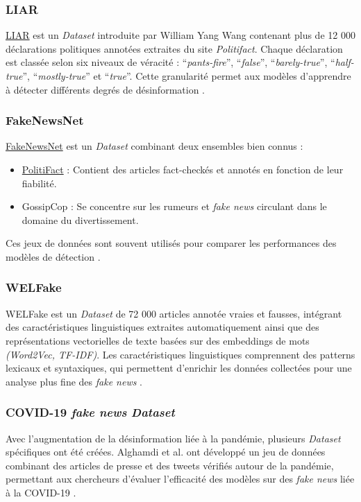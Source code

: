 \documentclass[a4paper,12pt, twocolumn]{article}
\begin{document}
\begin{twocolumn}
\subsubsection{LIAR} 
\href{https://paperswithcode.com/Dataset/liar}{LIAR} est un \textit{Dataset} introduite par William Yang Wang contenant plus de 12 000 déclarations politiques annotées extraites du site \textit{Politifact}. Chaque déclaration est classée selon six niveaux de véracité : “\textit{pants-fire}”, “\textit{false}”, “\textit{barely-true}”, “\textit{half-true}”, “\textit{mostly-true}” et “\textit{true}”. Cette granularité permet aux modèles d’apprendre à détecter différents degrés de désinformation  \cite{william_yang_wang_liar_2017}.

\subsubsection{FakeNewsNet} 
\href{https://paperswithcode.com/dataset/fakenewsnet}{FakeNewsNet} \cite{rai_fake_2022} est un \textit{Dataset} combinant deux ensembles bien connus : \begin{itemize} 
\item \href{https://paperswithcode.com/Dataset/liar}{PolitiFact} : Contient des articles fact-checkés et annotés en fonction de leur fiabilité. 
\item GossipCop : Se concentre sur les rumeurs et \textit{fake news} circulant dans le domaine du divertissement. \end{itemize} 
Ces jeux de données sont souvent utilisés pour comparer les performances des modèles de détection \cite{rai_fake_2022, hu_bad_2024, william_yang_wang_liar_2017}.

\subsubsection{WELFake} 
WELFake \cite{verma_welfake_2021} est un \textit{Dataset} de 72 000 articles annotée vraies et fausses, intégrant des caractéristiques linguistiques extraites automatiquement ainsi que des représentations vectorielles de texte basées sur des embeddings de mots \textit{(Word2Vec, TF-IDF)}. Les caractéristiques linguistiques comprennent des patterns lexicaux et syntaxiques, qui permettent d'enrichir les données collectées pour une analyse plus fine des \textit{fake news} \cite{verma_welfake_2021, truica_its_2023}.

\subsubsection{COVID-19 \textit{fake news} \textit{Dataset}} 
Avec l’augmentation de la désinformation liée à la pandémie, plusieurs \textit{Dataset} spécifiques ont été créées. Alghamdi et al. ont développé un jeu de données combinant des articles de presse et des tweets vérifiés autour de la pandémie, permettant aux chercheurs d’évaluer l’efficacité des modèles sur des \textit{fake news} liée à la COVID-19 \cite{alghamdi_towards_2023}.


\end{twocolumn}
\end{document}
